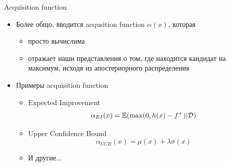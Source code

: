\documentclass[fullscreen=true, bookmarks=true, hyperref={pdfencoding=unicode}]{beamer}
\begin{document}
\begin{frame}{Acquisition function}

\begin{itemize}
    \item<1-> Более общо, вводится acqusition function $\alpha(x)$, которая
    \begin{itemize}
        \item<2-> просто вычислима
        \item<3-> отражает наши представления о том, где находится кандидат на максимум, исходя из апостериорного распределения
    \end{itemize}
    \item<4-> Примеры acquisition function 
    \begin{itemize}
        \item<5-> Expected Improvement
        \[
            \alpha_{EI}(x) = \mathbb{E}( \max(0, h(x) - f^{+}) | \mathcal{D} )
        \]
        \item<6-> Upper Confidence Bound
        \[
            \alpha_{UCB}(x) = \mu(x) + \lambda \sigma(x)
        \]
        \item<7-> И другие...
    \end{itemize}
\end{itemize}

\end{frame}
\end{document}
